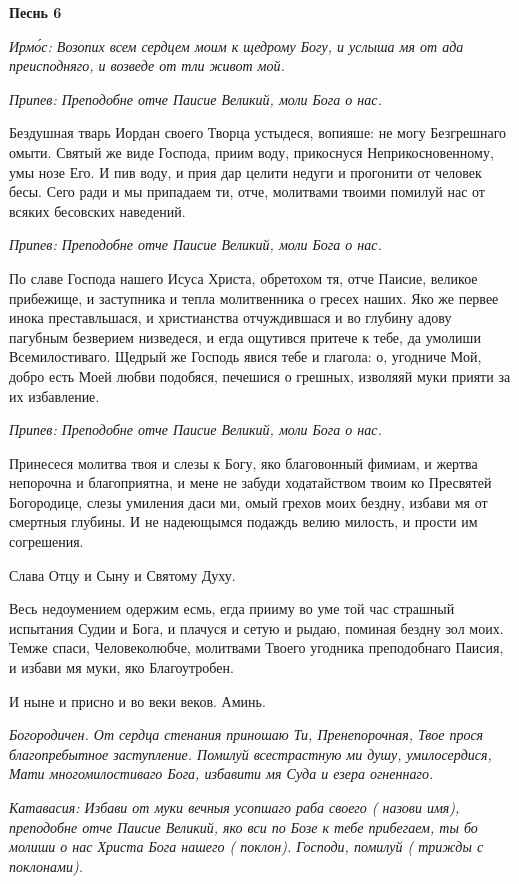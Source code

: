 \bfseries Песнь 6\normalfont{}


\itshape Ирмо́с:\normalfont{} Возопих всем сердцем моим к щедрому Богу, и услыша мя от ада преисподняго, и возведе от тли живот мой.


\itshape Припев:\normalfont{} Преподобне отче Паисие Великий, моли Бога о нас.


Бездушная тварь Иордан своего Творца устыдеся, вопияше: не могу Безгрешнаго омыти. Святый же виде Господа, приим воду, прикоснуся Неприкосновенному, умы нозе Его. И пив воду, и прия дар целити недуги и прогонити от человек бесы. Сего ради и мы припадаем ти, отче, молитвами твоими помилуй нас от всяких бесовских наведений.


\itshape Припев:\normalfont{} Преподобне отче Паисие Великий, моли Бога о нас.


По славе Господа нашего Исуса Христа, обретохом тя, отче Паисие, великое прибежище, и заступника и тепла молитвенника о гресех наших. Яко же первее инока преставльшася, и христианства отчуждившася и во глубину адову пагубным безверием низведеся, и егда ощутився притече к тебе, да умолиши Всемилостиваго. Щедрый же Господь явися тебе и глагола: о, угодниче Мой, добро есть Моей любви подобяся, печешися о грешных, изволяяй муки прияти за их избавление.


\itshape Припев:\normalfont{} Преподобне отче Паисие Великий, моли Бога о нас.


Принесеся молитва твоя и слезы к Богу, яко благовонный фимиам, и жертва непорочна и благоприятна, и мене не забуди ходатайством твоим ко Пресвятей Богородице, слезы умиления даси ми, омый грехов моих бездну, избави мя от смертныя глубины. И не надеющымся подаждь велию милость, и прости им согрешения.


Слава Отцу и Сыну и Святому Духу.


Весь недоумением одержим есмь, егда прииму во уме той час страшный испытания Судии и Бога, и плачуся и сетую и рыдаю, поминая бездну зол моих. Темже спаси, Человеколюбче, молитвами Твоего угодника преподобнаго Паисия, и избави мя муки, яко Благоутробен.


И ныне и присно и во веки веков. Аминь.


\itshape Богородичен.\normalfont{} От сердца стенания приношаю Ти, Пренепорочная, Твое прося благопребытное заступление. Помилуй всестрастную ми душу, умилосердися, Мати многомилостиваго Бога, избавити мя Суда и езера огненнаго.


\itshape Катавасия:\normalfont{} Избави от муки вечныя усопшаго раба своего ( \itshape назови имя\normalfont{}), преподобне отче Паисие Великий, яко вси по Бозе к тебе прибегаем, ты бо молиши о нас Христа Бога нашего ( \itshape поклон\normalfont{}). Господи, помилуй ( \itshape трижды с поклонами\normalfont{}).


